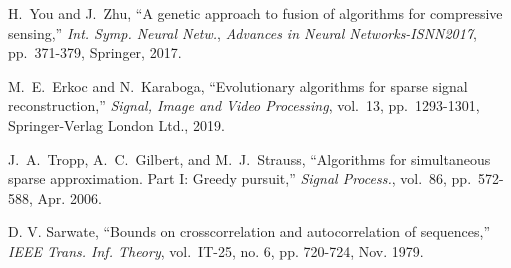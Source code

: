 \documentclass[journal]{IEEEtran}
\numberwithin{const2}{const}
\begin{document}
\begin{thebibliography}{1}
    H.~You and J.~Zhu,
    ``A genetic approach to fusion of algorithms for compressive sensing,''
    \emph{Int. Symp. Neural Netw.}, \emph{Advances in Neural Networks-ISNN2017}, 
    pp.~371-379, Springer, 2017.
    
    M.~E.~Erkoc and N.~Karaboga,
    ``Evolutionary algorithms for sparse signal reconstruction,''
    \emph{Signal, Image and Video Processing}, vol.~13, pp.~1293-1301, Springer-Verlag London Ltd., 2019.
	
		
	
	


	J.~A.~Tropp, A.~C.~Gilbert, and M.~J.~Strauss,
	``Algorithms for simultaneous sparse approximation. Part I: Greedy pursuit,''
	\textit{Signal Process.}, vol.~86, pp.~572-588, Apr. 2006.	
	
	
	D. V. Sarwate,
	``Bounds on crosscorrelation and autocorrelation of sequences,''
	\emph{IEEE Trans. Inf. Theory}, vol.~IT-25, no. 6, pp. 720-724, Nov. 1979.
	
	
	
	
%	
%	
%	
%	
%	
%	
%	
%	
%	
%	
%	


\end{thebibliography}
\end{document}
